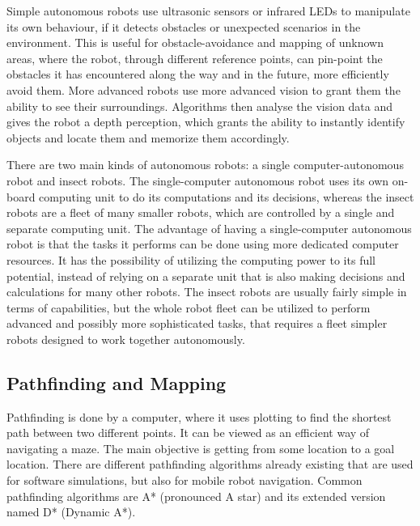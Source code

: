 Simple autonomous robots use ultrasonic sensors or infrared LEDs to manipulate its own behaviour, if it detects obstacles or unexpected scenarios in the environment. This is useful for obstacle-avoidance and mapping of unknown areas, where the robot, through different reference points, can pin-point the obstacles it has encountered along the way and in the future, more efficiently avoid them.
More advanced robots use more advanced vision to grant them the ability to see their surroundings. Algorithms then analyse the vision data and gives the robot a depth perception, which grants the ability to instantly identify objects and locate them and memorize them accordingly\cite{obstacles}.

There are two main kinds of autonomous robots: a single computer-autonomous robot and insect robots. The single-computer autonomous robot uses its own on-board computing unit to do its computations and its decisions, whereas the insect robots are a fleet of many smaller robots, which are controlled by a single and separate computing unit. The advantage of having a single-computer autonomous robot is that the tasks it performs can be done using more dedicated computer resources. It has the possibility of utilizing the computing power to its full potential, instead of relying on a separate unit that is also making decisions and calculations for many other robots. The insect robots are usually fairly simple in terms of capabilities, but the whole robot fleet can be utilized to perform advanced and possibly more sophisticated tasks, that requires a fleet simpler robots designed to work together autonomously\cite{singleandinsect}.

\subsection{Pathfinding and Mapping}

Pathfinding is done by a computer, where it uses plotting to find the shortest path between two different points. It can be viewed as an efficient way of navigating a maze. The main objective is getting from some location to a goal location.
There are different pathfinding algorithms already existing that are used for software simulations, but also for mobile robot navigation. Common pathfinding algorithms are A* (pronounced A star) and its extended version named D* (Dynamic A*).

